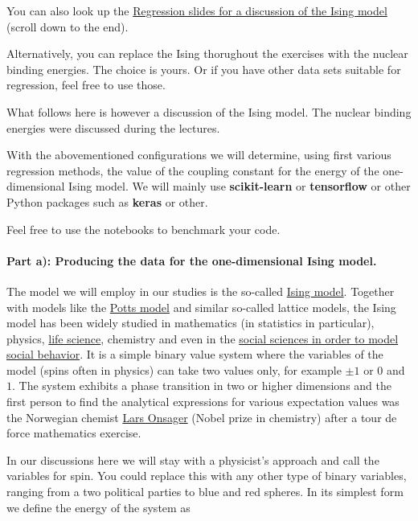 \documentclass[%
oneside,                 %
final,                   %
10pt]{article}
\begin{document}
You can also look up the \href{{https://compphysics.github.io/MachineLearningECT/doc/pub/Day1/html/Day1.html}}{Regression slides for a discussion of the Ising model} (scroll down to the end).

Alternatively, you can replace the Ising thorughout the exercises with the nuclear binding energies. The choice is yours. Or if you have other data sets suitable for regression, feel free to use those.


What follows here is however a discussion of the Ising model. The nuclear binding energies were discussed during the lectures.

With the abovementioned configurations we will determine, using first
various regression methods, the value of the coupling constant for the
energy of the one-dimensional Ising model.
We will mainly use \textbf{scikit-learn} or \textbf{tensorflow} or other Python packages such as \textbf{keras} or other.

Feel free to use the notebooks to benchmark your code.  


\paragraph{Part a): Producing the data for the one-dimensional Ising model.}
The model we will employ in our studies is the so-called \href{{https://en.wikipedia.org/wiki/Ising_model}}{Ising
model}.  Together with
models like the \href{{https://en.wikipedia.org/wiki/Potts_model}}{Potts
model} and similar
so-called lattice models, the Ising model has been widely studied in
mathematics (in statistics in particular), physics, \href{{https://journals.aps.org/pre/abstract/10.1103/PhysRevE.93.062402}}{life
science},
chemistry and even in the \href{{https://www.springer.com/gp/book/9781461420316}}{social sciences in order to model social
behavior}. It is a
simple binary value system where the variables of the model (spins often in
physics) can take two values only, for example $\pm 1$ or $0$ and $1$.
The system exhibits a phase transition in two or higher dimensions and
the first person to find the analytical expressions for various
expectation values was the Norwegian chemist \href{{https://en.wikipedia.org/wiki/Lars_Onsager}}{Lars
Onsager} (Nobel prize in
chemistry) after a tour de force mathematics exercise.

In our discussions here we will stay with a physicist's approach and
call the variables for spin. You could replace this with any other
type of binary variables, ranging from a two political parties to blue
and red spheres.  In its simplest form we define the energy of the
system as
\end{document}
